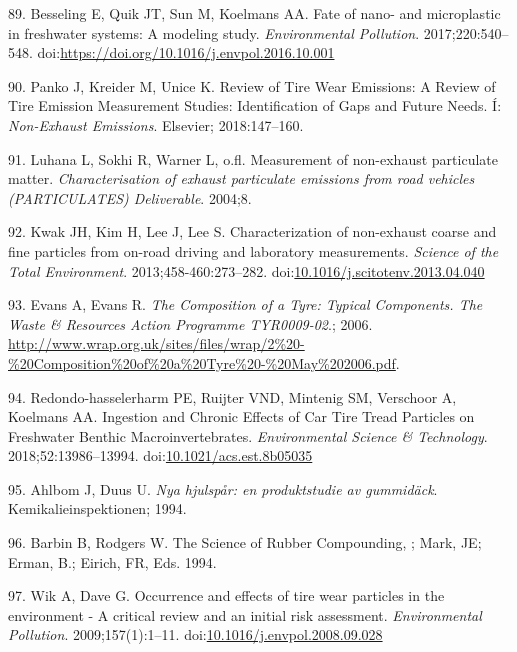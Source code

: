 \documentclass[icelandic,]{book}
\begin{document}
\leavevmode\hypertarget{ref-BESSELING2017540}{}%
89. Besseling E, Quik JT, Sun M, Koelmans AA. Fate of nano- and microplastic in freshwater systems: A modeling study. \emph{Environmental Pollution}. 2017;220:540--548. doi:\href{https://doi.org/https://doi.org/10.1016/j.envpol.2016.10.001}{https://doi.org/10.1016/j.envpol.2016.10.001}

\leavevmode\hypertarget{ref-panko2018review}{}%
90. Panko J, Kreider M, Unice K. Review of Tire Wear Emissions: A Review of Tire Emission Measurement Studies: Identification of Gaps and Future Needs. Í: \emph{Non-Exhaust Emissions}. Elsevier; 2018:147--160.

\leavevmode\hypertarget{ref-luhana2004measurement}{}%
91. Luhana L, Sokhi R, Warner L, o.fl. Measurement of non-exhaust particulate matter. \emph{Characterisation of exhaust particulate emissions from road vehicles (PARTICULATES) Deliverable}. 2004;8.

\leavevmode\hypertarget{ref-Kwak2013}{}%
92. Kwak JH, Kim H, Lee J, Lee S. Characterization of non-exhaust coarse and fine particles from on-road driving and laboratory measurements. \emph{Science of the Total Environment}. 2013;458-460:273--282. doi:\href{https://doi.org/10.1016/j.scitotenv.2013.04.040}{10.1016/j.scitotenv.2013.04.040}

\leavevmode\hypertarget{ref-Evans2006}{}%
93. Evans A, Evans R. \emph{The Composition of a Tyre: Typical Components. The Waste \& Resources Action Programme TYR0009-02}.; 2006. \url{http://www.wrap.org.uk/sites/files/wrap/2\%20-\%20Composition\%20of\%20a\%20Tyre\%20-\%20May\%202006.pdf}.

\leavevmode\hypertarget{ref-Redondo-hasselerharm2018}{}%
94. Redondo-hasselerharm PE, Ruijter VND, Mintenig SM, Verschoor A, Koelmans AA. Ingestion and Chronic Effects of Car Tire Tread Particles on Freshwater Benthic Macroinvertebrates. \emph{Environmental Science \& Technology}. 2018;52:13986--13994. doi:\href{https://doi.org/10.1021/acs.est.8b05035}{10.1021/acs.est.8b05035}

\leavevmode\hypertarget{ref-ahlbom1994nya}{}%
95. Ahlbom J, Duus U. \emph{Nya hjulspår: en produktstudie av gummidäck}. Kemikalieinspektionen; 1994.

\leavevmode\hypertarget{ref-barbin1994science}{}%
96. Barbin B, Rodgers W. The Science of Rubber Compounding, ; Mark, JE; Erman, B.; Eirich, FR, Eds. 1994.

\leavevmode\hypertarget{ref-Wik2009}{}%
97. Wik A, Dave G. Occurrence and effects of tire wear particles in the environment - A critical review and an initial risk assessment. \emph{Environmental Pollution}. 2009;157(1):1--11. doi:\href{https://doi.org/10.1016/j.envpol.2008.09.028}{10.1016/j.envpol.2008.09.028}
\end{document}
